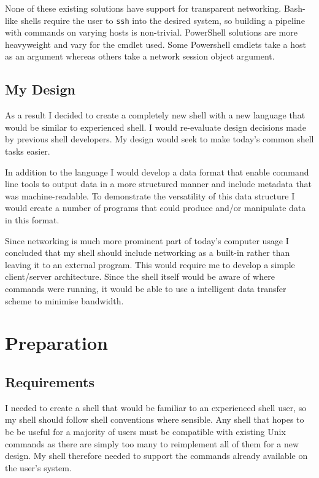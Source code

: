 \documentclass[12pt,twoside,notitlepage]{report}
\begin{document}
None of these existing solutions have support for transparent
networking. Bash-like shells require the user to {\tt ssh} into the
desired system, so building a pipeline with commands on varying hosts
is non-trivial. PowerShell solutions are more heavyweight and vary for
the cmdlet used. Some Powershell cmdlets take a host as an argument
whereas others take a network session object argument.

\section{My Design}

As a result I decided to create a completely new shell with a new
language that would be similar to experienced shell. I would
re-evaluate design decisions made by previous shell developers. My
design would seek to make today's common shell tasks easier.

In addition to the language I would develop a data format that enable
command line tools to output data in a more structured manner and
include metadata that was machine-readable. To demonstrate the
versatility of this data structure I would create a number of programs
that could produce and/or manipulate data in this format.

Since networking is much more prominent part of today's computer usage
I concluded that my shell should include networking as a built-in
rather than leaving it to an external program. This would require me
to develop a simple client/server architecture. Since the shell itself
would be aware of where commands were running, it would be able to use
a intelligent data transfer scheme to minimise bandwidth.

\cleardoublepage

\chapter{Preparation}

\section{Requirements}
I needed to create a shell that would be familiar to an experienced shell user,
so my shell should follow shell conventions where sensible. Any shell that hopes
to be be useful for a majority of users must be compatible with existing Unix
commands as there are simply too many to reimplement all of them for a new
design. My shell therefore needed to support the commands already available on
the user's system.
\end{document}
